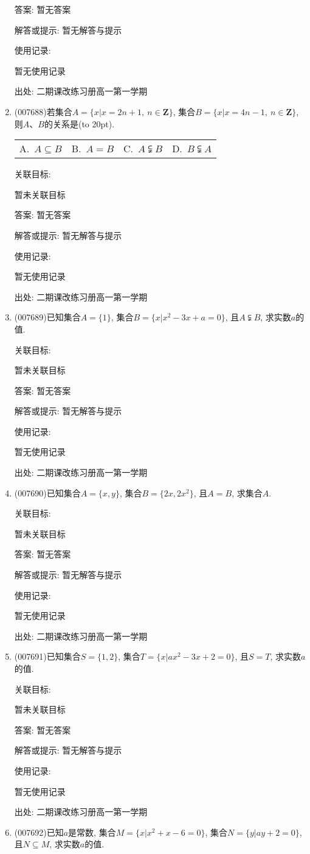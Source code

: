 \documentclass[10pt,a4paper]{article}
\newcommand{\bracket}[1]{(\hbox to #1pt{})}
\newcommand{\fourch}[4]{\par\begin{tabular}{p{.23\textwidth}p{.23\textwidth}p{.23\textwidth}p{.23\textwidth}}
A.~#1 &B.~#2& C.~#3& D.~#4
\end{tabular}}
\begin{document}
\begin{enumerate}[1.]
答案: 暂无答案

解答或提示: 暂无解答与提示

使用记录:

暂无使用记录


出处: 二期课改练习册高一第一学期
\item { (007688)}若集合$A=\{x|x=2n+1, \ n\in \mathbf{Z}\}$, 集合$B=\{x|x=4n-1, \ n\in \mathbf{Z}\}$, 则$A$、$B$的关系是\bracket{20}.
\fourch{$A\subseteq B$}{$A=B$}{$A\subsetneqq B$}{$B\subsetneqq A$}


关联目标:

暂未关联目标

答案: 暂无答案

解答或提示: 暂无解答与提示

使用记录:

暂无使用记录


出处: 二期课改练习册高一第一学期
\item { (007689)}已知集合$A=\{1\}$, 集合$B=\{x|x^2-3x+a=0\}$, 且$A\subsetneqq B$, 求实数$a$的值.


关联目标:

暂未关联目标

答案: 暂无答案

解答或提示: 暂无解答与提示

使用记录:

暂无使用记录


出处: 二期课改练习册高一第一学期
\item { (007690)}已知集合$A=\{x,y\}$, 集合$B=\{2x,2x^2\}$, 且$A=B$, 求集合$A$.


关联目标:

暂未关联目标

答案: 暂无答案

解答或提示: 暂无解答与提示

使用记录:

暂无使用记录


出处: 二期课改练习册高一第一学期
\item { (007691)}已知集合$S=\{1,2\}$, 集合$T=\{x|ax^2-3x+2=0\}$, 且$S=T$, 求实数$a$的值.


关联目标:

暂未关联目标

答案: 暂无答案

解答或提示: 暂无解答与提示

使用记录:

暂无使用记录


出处: 二期课改练习册高一第一学期
\item { (007692)}已知$a$是常数, 集合$M=\{x|x^2+x-6=0\}$, 集合$N=\{y|ay+2=0\}$, 且$N\subseteq M$, 求实数$a$的值.



\end{enumerate}
\end{document}
